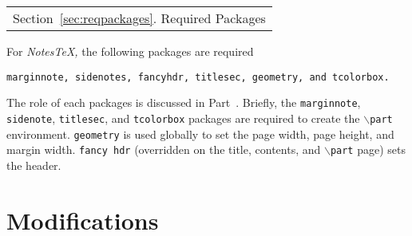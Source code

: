 \documentclass[10pt]{article}
\begin{document}
\begin{margintable}\vspace{.8in}\footnotesize
		\begin{tabularx}{\marginparwidth}{|X}
		Section~\ref{sec:reqpackages}. Required Packages\\
		\end{tabularx}
	\end{margintable}
	For \textit{NotesTeX,} the following packages are required
	\begin{center}
		\texttt{marginnote, sidenotes, fancyhdr, titlesec, geometry, and tcolorbox.}
	\end{center}
	The role of each packages is discussed in Part~\ref{Part:Modification}. Briefly, the \texttt{marginnote}, \texttt{sidenote}, \texttt{titlesec}, and \texttt{tcolorbox} packages are required to create the \texttt{$\backslash$part} environment. \texttt{geometry} is used globally to set the page width, page height, and margin width. \texttt{fancy\ hdr} (overridden on the title, contents, and \texttt{$\backslash$part} page) sets the header.

\part{Modifications}\label{Part:Modification}
\end{document}
